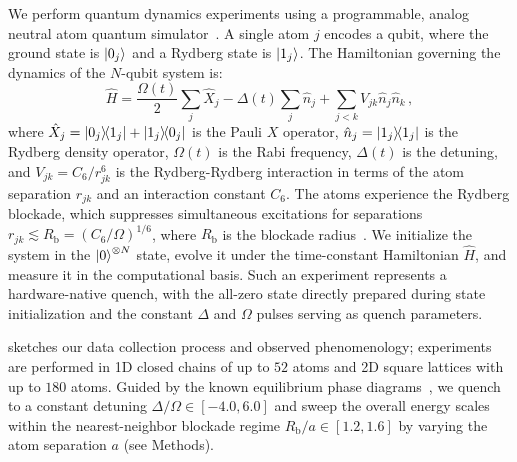 \documentclass[english,floatfix,twocolumn,showpacs, aps, prx, reprint, superscriptaddress, longbibliography]{revtex4-2}
\begin{document}
We perform quantum dynamics experiments using a programmable, analog neutral atom quantum simulator~\cite{aquila:2023}.  
A single atom $j$ encodes a qubit, where the ground state is $\ket{0_j}$ and a Rydberg state is $\ket{1_j}$. The Hamiltonian governing the dynamics of the $N$-qubit system is:
\begin{equation}
\hat{H} = \frac{\Omega (t)}{2} \sum_j \hat{X}_j - \Delta (t) \sum_j \hat{n}_j + \sum_{j<k} V_{jk} \hat{n}_j \hat{n}_k \, ,
\label{eq:hamiltonian}
\end{equation}
where $\hat{X}_j = \outerproduct{0_j}{1_j} + \outerproduct{1_j}{0_j}$ is the Pauli $X$ operator, $\hat{n}_j = \outerproduct{1_j}{1_j}$ is the Rydberg density operator, $\Omega (t)$ is the Rabi frequency, $\Delta (t)$ is the detuning, and $V_{jk} = C_6 / r_{jk}^6$ is the Rydberg-Rydberg interaction in terms of the atom separation $r_{jk}$ and an interaction constant $C_6$. The atoms experience the Rydberg blockade, which suppresses simultaneous excitations for separations $r_{jk} \lesssim R_\mathrm{b}= (C_6 / \Omega)^{1/6}$, where $R_\mathrm{b}$ is the blockade radius~\cite{Jaksch:2000,Lukin:2001}. We initialize the system in the $\ket{0}^{\otimes N}$ state, evolve it under the time-constant Hamiltonian $\hat{H}$, and measure it in the computational basis. Such an experiment represents a hardware-native quench, with the all-zero state directly prepared during state initialization and the constant $\Delta$ and $\Omega$ pulses serving as quench parameters.

 sketches our data collection process and observed phenomenology; experiments are performed in 1D closed chains of up to $52$ atoms and 2D square lattices with up to $180$ atoms. Guided by the known equilibrium phase diagrams~\cite{Ebadi:2021}, we quench to a constant detuning $\Delta / \Omega \in [-4.0, 6.0]$ and sweep the overall energy scales within the nearest-neighbor blockade regime $R_\mathrm{b} / a \in [1.2, 1.6]$ by varying the atom separation $a$ (see Methods).
\end{document}
